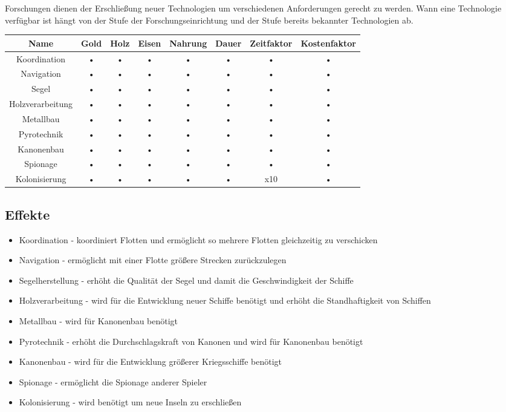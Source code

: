 \documentclass[10pt,a4paper]{article}
\begin{document}
Forschungen dienen der Erschließung neuer Technologien um verschiedenen Anforderungen gerecht zu werden. 
Wann eine Technologie verfügbar ist hängt von der Stufe der Forschungseinrichtung und der Stufe bereits bekannter Technologien ab. 
\\[3mm]
\begin{tabular}{|c|c|c|c|c|c|c|c|}
\hline 
Name & Gold & Holz & Eisen & Nahrung & Dauer & Zeitfaktor & Kostenfaktor \\ 
\hline 
Koordination & • & • & • & • & • & • & •  \\ 
\hline 
Navigation & • & • & • & • & • & • & •  \\ 
\hline 
Segel & • & • & • & • & • & • & •  \\ 
\hline 
Holzverarbeitung & • & • & • & • & • & • & •  \\ 
\hline 
Metallbau & • & • & • & • & • & • & •  \\ 
\hline 
Pyrotechnik & • & • & • & • & • & • & •  \\ 
\hline 
Kanonenbau & • & • & • & • & • & • & •  \\ 
\hline 
Spionage & • & • & • & • & • & • & •  \\ 
\hline 
Kolonisierung & • & • & • & • & • & x10 & •  \\ 
\hline 
\end{tabular} 

\subsection{Effekte}

\begin{itemize}
\item Koordination - koordiniert Flotten und ermöglicht so mehrere Flotten gleichzeitig zu verschicken
\item Navigation - ermöglicht mit einer Flotte größere Strecken zurückzulegen
\item Segelherstellung - erhöht die Qualität der Segel und damit die Geschwindigkeit der Schiffe
\item Holzverarbeitung - wird für die Entwicklung neuer Schiffe benötigt und erhöht die Standhaftigkeit von Schiffen
\item Metallbau - wird für Kanonenbau benötigt
\item Pyrotechnik - erhöht die Durchschlagskraft von Kanonen und wird für Kanonenbau benötigt
\item Kanonenbau - wird für die Entwicklung größerer Kriegsschiffe benötigt
\item Spionage - ermöglicht die Spionage anderer Spieler
\item Kolonisierung - wird benötigt um neue Inseln zu erschließen
\end{itemize}
\end{document}
